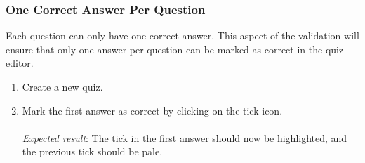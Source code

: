 \subsubsection{One Correct Answer Per Question} %
\label{ssub:one_correct_answer_}
Each question can only have one correct answer. This aspect of the validation will ensure that only one answer per question can be marked as correct in the quiz editor.

\begin{enumerate}
  \item Create a new quiz.
  \item Mark the first answer as correct by clicking on the tick icon.\\\\
  \textit{Expected result}: The tick in the first answer should now be highlighted, and the previous tick should be pale.
\end{enumerate}
